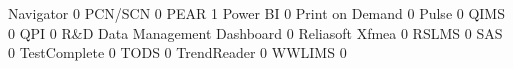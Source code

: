 \documentclass{article}
\begin{document}
\begin{Schunk}
\begin{Soutput}
  Navigator                                                                   0
  PCN/SCN                                                                     0
  PEAR                                                                        1
  Power BI                                                                    0
  Print on Demand                                                             0
  Pulse                                                                       0
  QIMS                                                                        0
  QPI                                                                         0
  R&D Data Management Dashboard                                               0
  Reliasoft Xfmea                                                             0
  RSLMS                                                                       0
  SAS                                                                         0
  TestComplete                                                                0
  TODS                                                                        0
  TrendReader                                                                 0
  WWLIMS                                                                      0
                                                           

\end{Soutput}
\end{Schunk}
\end{document}
